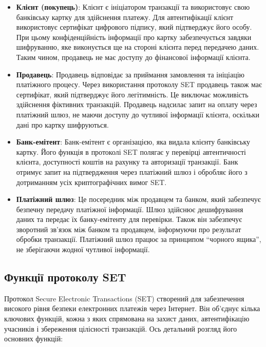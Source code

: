 \begin{itemize}
    \item \textbf{Клієнт (покупець)}: Клієнт є ініціатором транзакції та використовує свою банківську картку для здійснення платежу. Для автентифікації клієнт використовує сертифікат цифрового підпису, який підтверджує його особу. При цьому конфіденційність інформації про картку забезпечується завдяки шифруванню, яке виконується ще на стороні клієнта перед передачею даних. Таким чином, продавець не має доступу до фінансової інформації клієнта.

    \item \textbf{Продавець}: Продавець відповідає за приймання замовлення та ініціацію платіжного процесу. Через використання протоколу SET продавець також має сертифікат, який підтверджує його легітимність. Це виключає можливість здійснення фіктивних транзакцій. Продавець надсилає запит на оплату через платіжний шлюз, не маючи доступу до чутливої інформації клієнта, оскільки дані про картку шифруються.

    \item \textbf{Банк-емітент}: Банк-емітент є організацією, яка видала клієнту банківську картку. Його функція в протоколі SET полягає у перевірці автентичності клієнта, доступності коштів на рахунку та авторизації транзакції. Банк отримує запит на підтвердження через платіжний шлюз і обробляє його з дотриманням усіх криптографічних вимог SET.

    \item \textbf{Платіжний шлюз}: Це посередник між продавцем та банком, який забезпечує безпечну передачу платіжної інформації. Шлюз здійснює дешифрування даних та передає їх банку-емітенту для перевірки. Також він забезпечує зворотний зв'язок між банком та продавцем, інформуючи про результат обробки транзакції. Платіжний шлюз працює за принципом ``чорного ящика'', не зберігаючи жодної чутливої інформації.
\end{itemize}

\subsection{Функції протоколу SET}

Протокол Secure Electronic Transactions (SET) створений для забезпечення високого рівня безпеки електронних платежів через Інтернет. Він об'єднує кілька ключових функцій, кожна з яких спрямована на захист даних, автентифікацію учасників і збереження цілісності транзакцій. Ось детальний розгляд його основних функцій:


